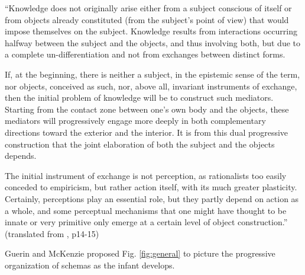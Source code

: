 \documentclass[runningheads]{llncs}
\begin{document}
\begin{adjustwidth}{1cm}{1cm}
``Knowledge does not originally arise either from a subject conscious of itself or from objects already constituted (from the subject's point of view) that would impose themselves on the subject. 
Knowledge results from interactions occurring halfway between the subject and the objects, and thus involving both, but due to a complete un-differentiation and not from exchanges between distinct forms.

If, at the beginning, there is neither a subject, in the epistemic sense of the term, nor objects, conceived as such, nor, above all, invariant instruments of exchange, then the initial problem of knowledge will be to construct such mediators. 
Starting from the contact zone between one's own body and the objects, these mediators will progressively engage more deeply in both complementary directions toward the exterior and the interior. 
It is from this dual progressive construction that the joint elaboration of both the subject and the objects depends.

The initial instrument of exchange is not perception, as rationalists too easily conceded to empiricism, but rather action itself, with its much greater plasticity. 
Certainly, perceptions play an essential role, but they partly depend on action as a whole, and some perceptual mechanisms that one might have thought to be innate or very primitive only emerge at a certain level of object construction.'' (translated from \cite{piaget_lepistemologie_2011}, p14-15)
\\

\end{adjustwidth}


Guerin and McKenzie \cite{guerin_survey_2013} proposed Fig. \ref{fig:general} to picture the progressive organization of schemas as the infant develops.
\end{document}
